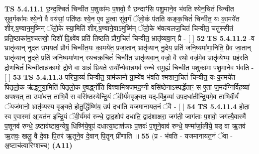 \documentclass[17pt]{extarticle}
\begin{document}
                                        \textbf{ TS 5.4.11.1} \newline
                  छ॒न्द॒श्चितं॑ चिन्वीत प॒शुका॑मः प॒शवो॒ वै छन्दाꣳ॑सि पशु॒माने॒व भ॑वति श्येन॒चितं॑ चिन्वीत सुव॒र्गका॑मः श्ये॒नो वै वय॑सां॒ पति॑ष्ठः श्ये॒न ए॒व भू॒त्वा सु॑व॒र्गं ॅलो॒कं प॑तति कङ्क॒चितं॑ चिन्वीत॒ यः का॒मये॑त शीर्.ष॒ण्वान॒मुष्मि॑न् ॅलो॒के स्या॒मिति॑ शीर्.ष॒ण्वाने॒वाऽमुष्मि॑न् ॅलो॒के भ॑वत्यलज॒चितं॑ चिन्वीत॒ चतु॑स्सीतं प्रति॒ष्ठाका॑म॒श्चत॑स्रो॒ दिशो॑ दि॒क्ष्वे॑व प्रति॑ तिष्ठति प्रौग॒चितं॑ चिन्वीत॒ भ्रातृ॑व्यवा॒न् प्रै - [  ] \textbf{  52} \newline
                  \newline
                                \textbf{ TS 5.4.11.2} \newline
                  -व भ्रातृ॑व्यान् नुदत उभ॒यतः॑ प्रौगं चिन्वीत॒यः का॒मये॑त॒ प्रजा॒तान् भ्रातृ॑व्यान् नु॒देय॒ प्रति॑ जनि॒ष्यमा॑णा॒निति॒ प्रैव जा॒तान् भ्रातृ॑व्यान् नु॒दते॒ प्रति॑ जनि॒ष्यमा॑णान् रथचक्र॒चितं॑ चिन्वीत॒ भ्रातृ॑व्यवा॒न्॒ वज्रो॒ वै रथो॒ वज्र॑मे॒व भ्रातृ॑व्येभ्यः॒ प्रह॑रति द्रोण॒चितं॑ चिन्वी॒तान्न॑कामो॒ द्रोणे॒ वा अन्नं॑ भ्रियते॒ सयो᳚न्ये॒वान्न॒मव॑ रुन्धे समू॒ह्यं॑ चिन्वीत प॒शुका॑मः पशु॒माने॒व भ॑वति - [  ] \textbf{  53} \newline
                  \newline
                                \textbf{ TS 5.4.11.3} \newline
                  परिचा॒य्यं॑ चिन्वीत॒ ग्राम॑कामो ग्रा॒म्ये॑व भ॑वति श्मशान॒चितं॑ चिन्वीत॒ यः का॒मये॑त पितृलो॒क ऋ॑द्ध्नुया॒मिति॑ पितृलो॒क ए॒वर्द्ध्नो॑ति विश्वामित्रजमद॒ग्नी वसि॑ष्ठेनाऽस्पर्द्धेताꣳ॒॒ स ए॒ता ज॒मद॑ग्निर्विह॒व्या॑ अपश्य॒त् ता उपा॑धत्त॒ ताभि॒र्वै स वसि॑ष्ठस्येन्द्रि॒यं ॅवी॒र्य॑मवृङ्क्त॒ यद्-वि॑ह॒व्या॑ उप॒दधा॑तीन्द्रि॒यमे॒व ताभि॑र्वी॒र्यं॑ ॅयज॑मानो॒ भ्रातृ॑व्यस्य वृङ्क्ते॒ होतु॒र्द्धिष्णि॑य॒ उप॑ दधाति यजमानायत॒नं ॅवै - [  ] \textbf{  54} \newline
                  \newline
                                \textbf{ TS 5.4.11.4} \newline
                  होता॒ स्व ए॒वास्मा॑ आ॒यत॑न इन्द्रि॒यं ॅवी॒र्य॑मव॑ रुन्धे॒ द्वाद॒शोप॑ दधाति॒ द्वाद॑शाक्षरा॒ जग॑ती॒ जाग॑ताः प॒शवो॒ जग॑त्यै॒वास्मै॑ प॒शूनव॑ रुन्धे॒ ऽष्टाव॑ष्टाव॒न्येषु॒ धिष्णि॑ये॒षूप॑ दधात्य॒ष्टाश॑फाः प॒शवः॑ प॒शूने॒वाव॑ रुन्धे॒ षण्मा᳚र्जा॒लीये॒ षड् वा ऋ॒तव॑ ऋ॒तवः॒ खलु॒ वै दे॒वाः पि॒तर॑ ऋ॒तूने॒व दे॒वान् पि॒तॄन् प्री॑णाति ॥ \textbf{  55} \newline
                  \newline
                      (प्र - भ॑वति - यजमानायत॒नं ॅवा - अ॒ष्टाच॑त्वारिꣳशच्च)  \textbf{(A11)} \newline \newline
\end{document}
